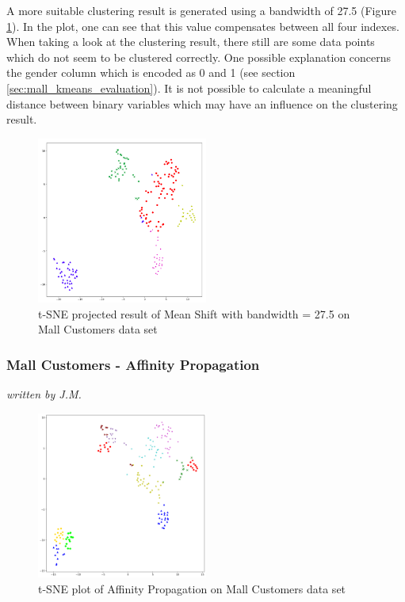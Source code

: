 A more suitable clustering result is generated using a bandwidth of 27.5 (Figure \ref{fig:meanshift_mall_27}). In the plot, one can see that this value compensates between all four indexes.
When taking a look at the clustering result, there still are some data points which do not seem to be clustered correctly. One possible explanation concerns the gender column which is encoded as 0 and 1 (see section \ref{sec:mall_kmeans_evaluation}). It is not possible to calculate a meaningful distance between binary variables which may have an influence on the clustering result. 

\begin{figure}[H]
\begin{center}
\includegraphics[width=0.5\textwidth]{images/Meanshift_Mall_27_5.png}
\caption{t-SNE projected result of Mean Shift with bandwidth = 27.5 on Mall Customers data set}
\label{fig:meanshift_mall_27}
\end{center}
\end{figure}

\subsubsection{Mall Customers - Affinity Propagation}
\textit{written by J.M.}\\

 \begin{figure}[H]
 	\begin{center}
 		\includegraphics[width=0.5\textwidth]{images/af_mallcustomers2870.png}
 	\end{center}
 	\caption{t-SNE plot of Affinity Propagation on Mall Customers data set}
 	\label{fig:af_mall1}
 \end{figure}
 
